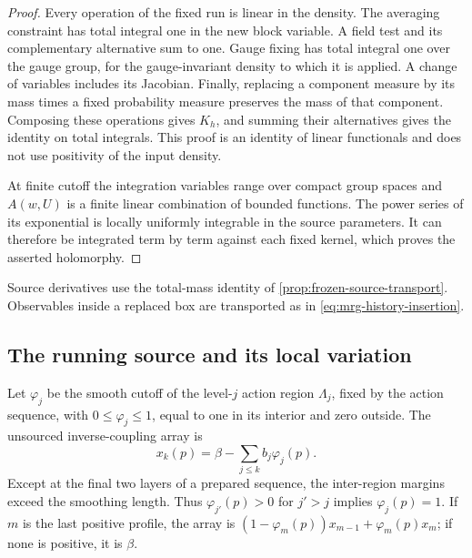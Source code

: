 \documentclass[11pt,letterpaper,reqno]{amsart}
\theoremstyle{definition}
\theoremstyle{remark}
\begin{document}
\begin{proof}
Every operation of the fixed run is linear in the density. The averaging
constraint has total integral one in the new block variable. A field test
and its complementary alternative sum to one. Gauge fixing has total
integral one over the gauge group, for the gauge-invariant density to
which it is applied. A change of variables includes its Jacobian.
Finally, replacing a component measure by its mass times a fixed
probability measure preserves the mass of that component. Composing
these operations gives $K_h$, and summing their alternatives gives the
identity on total integrals. This proof is an identity of linear
functionals and does not use positivity of the input density.

At finite cutoff the integration variables range over compact group
spaces and $A(w,U)$ is a finite linear combination of bounded functions.
The power series of its exponential is locally uniformly integrable in
the source parameters. It can therefore be integrated term by term
against each fixed kernel, which proves the asserted holomorphy.
\end{proof}

Source derivatives use the total-mass identity of
\cref{prop:frozen-source-transport}. Observables inside a replaced box
are transported as in \eqref{eq:mrg-history-insertion}.

\subsection{The running source and its local variation}

Let $\varphi_j$ be the smooth cutoff of the level-$j$ action
region $\Lambda_j$, fixed by the action sequence, with
$0\le\varphi_j\le1$, equal to one in its interior and zero
outside. The unsourced inverse-coupling array is
\[
 x_k(p)=\beta-\sum_{j\le k}b_j\varphi_j(p).
\]
Except at the final two layers of a prepared sequence, the
inter-region margins exceed the smoothing length. Thus
$\varphi_{j'}(p)>0$ for $j'>j$ implies $\varphi_j(p)=1$.
If $m$ is the last positive profile, the array is
$(1-\varphi_m(p))x_{m-1}+\varphi_m(p)x_m$; if none is
positive, it is $\beta$.
\end{document}
